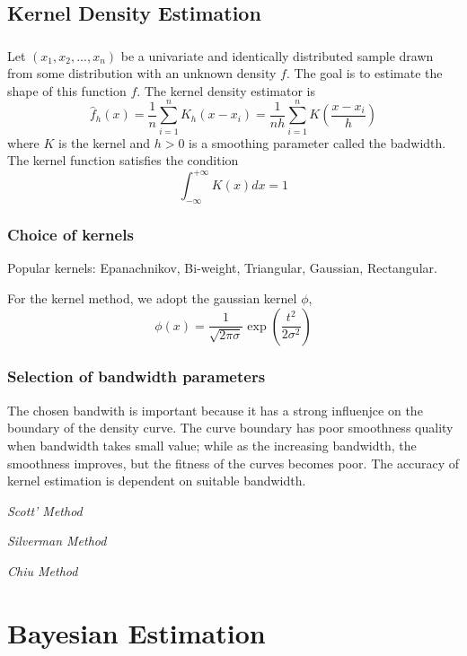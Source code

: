 \subsection{Kernel Density Estimation}

\subsubsection{}
Let $(x_1,x_2,...,x_n)$ be a univariate and identically distributed sample drawn from some distribution with an unknown density $f$.  
The goal is to estimate the shape of this function $f$.  The kernel density estimator is
\begin{equation}
  \hat{f}_h(x)=\frac{1}{n}\sum_{i=1}^{n}K_h(x-x_i)
    =\frac{1}{nh}\sum_{i=1}^{n}K\left(\frac{x-x_i}{h}\right)
\end{equation}
where $K$ is the kernel and $h>0$ is a smoothing parameter called the badwidth.  The kernel function satisfies the condition
\begin{equation}
  \int_{-\infty}^{+\infty}K(x)dx=1
\end{equation}
\subsubsection{Choice of kernels}
Popular kernels: Epanachnikov, Bi-weight, Triangular, Gaussian, Rectangular.

For the kernel method, we adopt the gaussian kernel $\phi$,
\begin{equation}
  \phi(x)=\frac{1}{\sqrt{2\pi\sigma}}\exp{\left(\frac{t^2}{2\sigma^2}\right)}
\end{equation}
\subsubsection{Selection of bandwidth parameters}
The chosen bandwith is important because it has a strong influenjce on the boundary of the density curve.  The curve boundary has poor smoothness quality when bandwidth takes small value; while as the increasing bandwidth, the smoothness improves, but the fitness of the curves becomes poor.  The accuracy of kernel estimation is dependent on suitable bandwidth.

\emph{Scott' Method}

\emph{Silverman Method}

\emph{Chiu Method}
\section{Bayesian Estimation}

